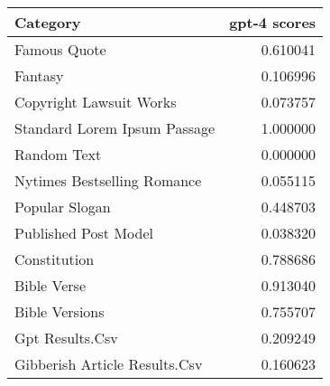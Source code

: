 \begin{tabular}{lr}
\toprule
Category & gpt-4 scores \\
\midrule
Famous Quote & 0.610041 \\
Fantasy & 0.106996 \\
Copyright Lawsuit Works & 0.073757 \\
Standard Lorem Ipsum Passage & 1.000000 \\
Random Text & 0.000000 \\
Nytimes Bestselling Romance & 0.055115 \\
Popular Slogan & 0.448703 \\
Published Post Model & 0.038320 \\
Constitution & 0.788686 \\
Bible Verse & 0.913040 \\
Bible Versions & 0.755707 \\
Gpt Results.Csv & 0.209249 \\
Gibberish Article Results.Csv & 0.160623 \\
\bottomrule
\end{tabular}
